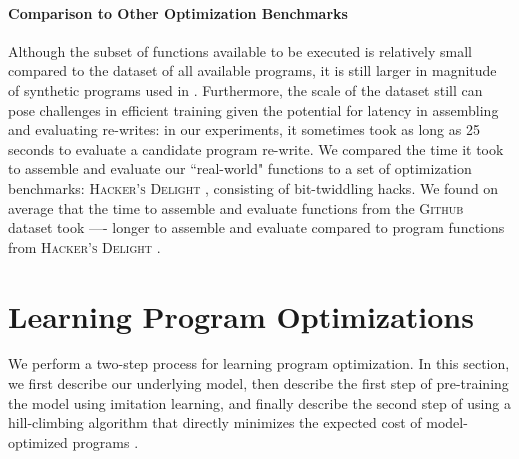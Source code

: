 \documentclass{article}
\newcommand{\GH}{\textsc{Github}}
\begin{document}
\paragraph{Comparison to Other Optimization Benchmarks}
Although the subset of functions available to be executed is relatively small compared to the dataset of all available programs, it is still larger in magnitude of synthetic programs used in \cite{shi2020} . Furthermore, the scale of the dataset still can pose challenges in efficient training given the potential for latency in assembling and evaluating re-writes: in our experiments, it sometimes took as long as 25 seconds to evaluate a candidate program re-write. We compared the time it took to assemble and evaluate our ``real-world" functions to a set of optimization benchmarks: \textsc{Hacker's Delight} \cite{warren2013hacker}, consisting of bit-twiddling hacks. We found on average that the time to assemble and evaluate functions from the \GH{} dataset took ---- longer to assemble and evaluate compared to program functions from \textsc{Hacker's Delight} . 

\section{Learning Program Optimizations}
\label{sec:learning}


We perform a two-step process for learning program optimization.
In this section, we first describe our underlying model, then describe the first step of pre-training the model using imitation learning, and finally describe the second step of using a hill-climbing algorithm that directly minimizes the expected cost of model-optimized programs .
\end{document}
